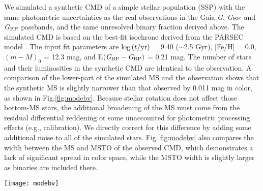 \documentclass[twocolumn]{aastex631}
\begin{document}
We simulated a synthetic CMD of a simple stellar population (SSP) with the same photometric uncertainties as the real observations in the Gaia \textit{G}, \textit{G}$_{\rm BP}$ and \textit{G}$_{\rm RP}$  passbands, and the same unresolved binary fraction derived above. The simulated CMD is based on the best-fit isochrone derived from the PARSEC model \citep{2012MNRAS.427..127B, Marigo2017A}. The input fit parameters are $\log{(t/{\rm yr})}$ = 9.40 ($\sim$2.5 Gyr), [Fe/H] = 0.0, $(m-M)_0$ = 12.3  mag, and E$(\textit{G}_{\rm BP}-\textit{G}_{\rm RP})$ = 0.21 mag. The number of stars and their luminosities in the synthetic CMD are identical to the observation. A comparison of the lower-part of the simulated MS and the observation shows that the synthetic MS is slightly narrower than that observed by 0.011 mag in color, as shown in Fig.\ref{fig:modebv}. Because stellar rotation does not affect those bottom-MS stars, the additional broadening of the MS must come from the residual differential reddening or some unaccounted for photometric processing effects (e.g., calibration). We directly correct for this difference by adding some additional noise to all of the simulated stars. Fig.\ref{fig:modebv} also compares the width between the MS and MSTO of the observed CMD, which demonstrates a lack of significant spread in color space, while the MSTO width is slightly larger as binaries are included there.
\begin{figure*}
	\centering
	\texttt{[image: modebv]}
	\caption{Left: the observed (top) and simulated (bottom) CMD of NGC 6819 with the fiducial line overplotted; Middle: the CMDs rectified by subtraction of the fiducial line; Right: color distribution of the rectified CMDs. The $\sigma$ in the inset is the dispersion of the best-fitting Gaussian. }
	\label{fig:modebv}
\end{figure*}
\end{document}
